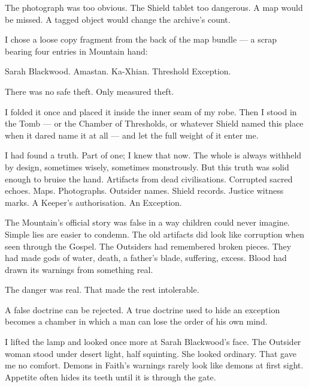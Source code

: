 The photograph was too obvious. The Shield tablet too dangerous. A map would be missed. A tagged object would change the archive's count.\par

I chose a loose copy fragment from the back of the map bundle --- a scrap bearing four entries in Mountain hand:\par

Sarah Blackwood. Amastan. Ka-Xhian. Threshold Exception.\par

There was no safe theft. Only measured theft.\par

I folded it once and placed it inside the inner seam of my robe. Then I stood in the Tomb --- or the Chamber of Thresholds, or whatever Shield named this place when it dared name it at all --- and let the full weight of it enter me.\par

I had found a truth. Part of one; I knew that now. The whole is always withheld by design, sometimes wisely, sometimes monstrously. But this truth was solid enough to bruise the hand. Artifacts from dead civilisations. Corrupted sacred echoes. Maps. Photographs. Outsider names. Shield records. Justice witness marks. A Keeper's authorisation. An Exception.\par

The Mountain's official story was false in a way children could never imagine. Simple lies are easier to condemn. The old artifacts did look like corruption when seen through the Gospel. The Outsiders had remembered broken pieces. They had made gods of water, death, a father's blade, suffering, excess. Blood had drawn its warnings from something real.\par

The danger was real. That made the rest intolerable.\par

A false doctrine can be rejected. A true doctrine used to hide an exception becomes a chamber in which a man can lose the order of his own mind.\par

I lifted the lamp and looked once more at Sarah Blackwood's face. The Outsider woman stood under desert light, half squinting. She looked ordinary. That gave me no comfort. Demons in Faith's warnings rarely look like demons at first sight. Appetite often hides its teeth until it is through the gate.\par

